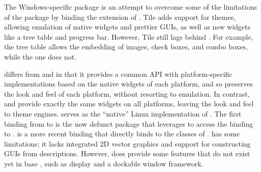 \documentclass[article,shortnames]{jss}
\begin{document}
The Windows-specific  package \citep{tcltk2} is an attempt
to overcome some
of the limitations of the  package by binding the
 extension
\citep{tcltk-tile} of . Tile adds support for themes,
allowing
emulation of native widgets and prettier GUIs, as well as new widgets
like a tree table and progress bar. However, Tile still lags behind
. For example, the  tree table allows the
embedding of images,
check boxes, and combo boxes, while the  one does not.

 \citep{wxwidgets} differs from  and
 in that it provides a common API with platform-specific
implementations based on the native widgets of each platform, and so 
preserves the look and feel of each platform, without
resorting to emulation.  In contrast,  and 
provide exactly the same widgets on all platforms, leaving the look
and feel to theme engines.   serves as the ``native'' Linux
implementation of .  The first binding from
 to  is the now defunct 
package that leverages  to access the 
binding to .   \citep{RwxWidgets} is a
more recent binding that directly binds to the  classes
of . 
 has some limitations; it lacks integrated 2D vector
graphics and support for constructing GUIs from 
descriptions. However,  does provide some features that
do not exist yet in base , such as  display
and a dockable window framework.
\end{document}
